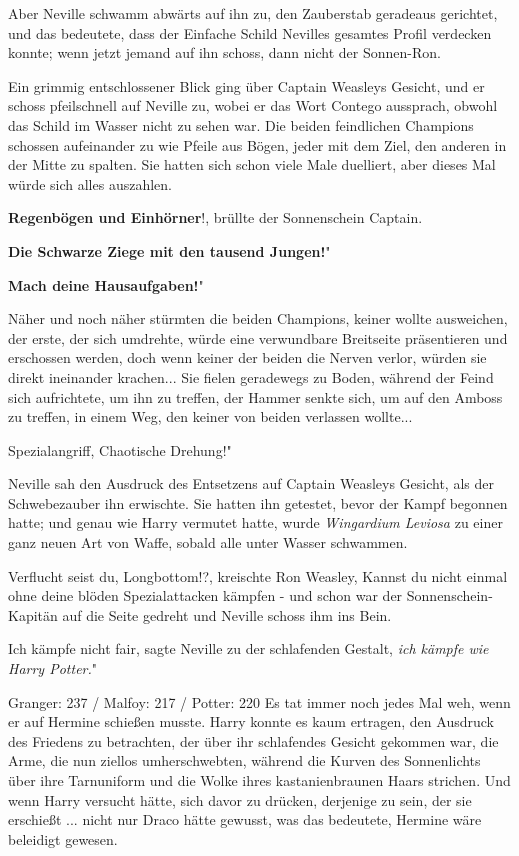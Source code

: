 Aber Neville schwamm abwärts auf ihn zu, den Zauberstab geradeaus gerichtet, und
das bedeutete, dass der Einfache Schild Nevilles gesamtes Profil verdecken
konnte; wenn jetzt jemand auf ihn schoss, dann nicht der Sonnen-Ron.

Ein grimmig entschlossener Blick ging über Captain Weasleys Gesicht, und er
schoss pfeilschnell auf Neville zu, wobei er das Wort Contego aussprach, obwohl
das Schild im Wasser nicht zu sehen war. Die beiden feindlichen Champions
schossen aufeinander zu wie Pfeile aus Bögen, jeder mit dem Ziel, den anderen in
der Mitte zu spalten. Sie hatten sich schon viele Male duelliert, aber dieses
Mal würde sich alles auszahlen.

\glqq \textbf{Regenbögen und Einhörner}!\grqq{}, brüllte der Sonnenschein
Captain.

\glqq \textbf{Die Schwarze Ziege mit den tausend Jungen!}"

\glqq \textbf{Mach deine Hausaufgaben!}"

Näher und noch näher stürmten die beiden Champions, keiner wollte ausweichen,
der erste, der sich umdrehte, würde eine verwundbare Breitseite präsentieren und
erschossen werden, doch wenn keiner der beiden die Nerven verlor, würden sie
direkt ineinander krachen... Sie fielen geradewegs zu Boden, während der Feind
sich aufrichtete, um ihn zu treffen, der Hammer senkte sich, um auf den Amboss
zu treffen, in einem Weg, den keiner von beiden verlassen wollte...

\glqq Spezialangriff, Chaotische Drehung!"

Neville sah den Ausdruck des Entsetzens auf Captain Weasleys Gesicht, als der
Schwebezauber ihn erwischte. Sie hatten ihn getestet, bevor der Kampf begonnen
hatte; und genau wie Harry vermutet hatte, wurde \emph{Wingardium Leviosa} zu
einer ganz neuen Art von Waffe, sobald alle unter Wasser schwammen.

\glqq Verflucht seist du, Longbottom!?\grqq{}, kreischte Ron Weasley, \glqq
Kannst du nicht einmal ohne deine blöden Spezialattacken kämpfen -\grqq{} und
schon war der Sonnenschein-Kapitän auf die Seite gedreht und Neville schoss ihm
ins Bein.

\glqq Ich kämpfe nicht fair\grqq{}, sagte Neville zu der schlafenden Gestalt,
\glqq \emph{ich kämpfe wie Harry Potter.}"

Granger: 237 / Malfoy: 217 / Potter: 220 Es tat immer noch jedes Mal weh, wenn
er auf Hermine schießen musste. Harry konnte es kaum ertragen, den Ausdruck des
Friedens zu betrachten, der über ihr schlafendes Gesicht gekommen war, die Arme,
die nun ziellos umherschwebten, während die Kurven des Sonnenlichts über ihre
Tarnuniform und die Wolke ihres kastanienbraunen Haars strichen. Und wenn Harry
versucht hätte, sich davor zu drücken, derjenige zu sein, der sie erschießt ...
nicht nur Draco hätte gewusst, was das bedeutete, Hermine wäre beleidigt
gewesen.

